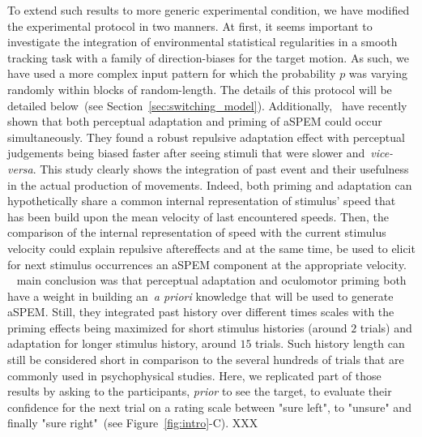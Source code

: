 \documentclass[profile,final,english, draft]{article}%
\newcommand{\citet}[1]{\textcite{#1}}
\newcommand{\seeFig}[1]{see Figure~\ref{fig:#1}}
\newcommand{\seeSec}[1]{see Section~\ref{sec:#1}}
\begin{document}
To extend such results to more generic experimental condition,
we have modified the experimental protocol in two manners.
At first, it seems important to investigate the integration of environmental statistical regularities
in a smooth tracking task with
a family of direction-biases for the target motion.
As such, we have used a more complex input pattern 
for which the probability $p$ was varying randomly
within blocks of random-length.
The details of this protocol will be detailed below~(\seeSec{switching_model}).
Additionally,~\citet{Maus2015} have recently shown that
both perceptual adaptation and priming of aSPEM could occur simultaneously.
They found a robust repulsive adaptation effect
with perceptual judgements being biased faster
after seeing stimuli that were slower and~\textit{vice-versa}.
This study clearly shows the integration of past event and
their usefulness in the actual production of movements.
Indeed, both priming and adaptation can hypothetically share
a common internal representation of stimulus' speed
that has been build upon the mean velocity of last encountered speeds.
Then, the comparison of the internal representation of speed
with the current stimulus velocity could explain repulsive aftereffects and
at the same time, be used to elicit for next stimulus occurrences
an aSPEM component at the appropriate velocity.
~\citet{Maus2015} main conclusion was that
perceptual adaptation and oculomotor priming
both have a weight in building an~\textit{a priori} knowledge
that will be used to generate aSPEM.
Still, they integrated past history over different times scales
with the priming effects being maximized
for short stimulus histories (around $2$ trials) and
adaptation for longer stimulus history, around $15$ trials.
Such history length can still be considered
short in comparison to the several hundreds 
of trials that are commonly used in psychophysical studies.
Here, we replicated part of those results
by asking to the participants,
\emph{prior} to see the target, 
to evaluate their confidence for the next trial on a rating scale 
between "sure left", to "unsure" and finally "sure right"~(\seeFig{intro}-C).
XXX
\end{document}
